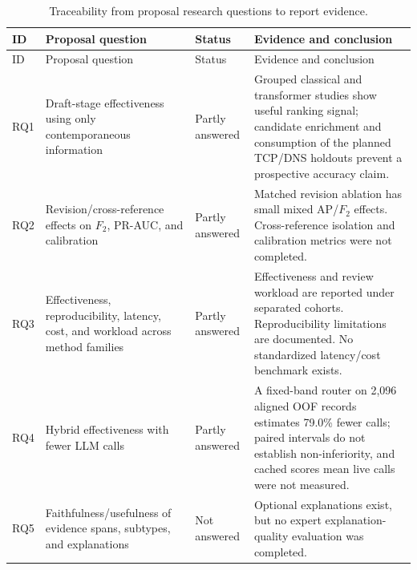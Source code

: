 \documentclass[12pt,a4paper,oneside]{report}
\begin{document}
{\small
\setlength{\tabcolsep}{4pt}
\begin{longtable}{>{\raggedright\arraybackslash}p{}>{\raggedright\arraybackslash}p{}>{\raggedright\arraybackslash}p{}>{\raggedright\arraybackslash}p{}}
\caption{Traceability from proposal research questions to report evidence.}\label{tab:rq-traceability}\\
\toprule
ID & Proposal question & Status & Evidence and conclusion \\
\midrule
\endfirsthead
\toprule
ID & Proposal question & Status & Evidence and conclusion \\
\midrule
\endhead
\bottomrule
\endfoot
RQ1 & Draft-stage effectiveness using only contemporaneous information & Partly answered & Grouped classical and transformer studies show useful ranking signal; candidate enrichment and consumption of the planned TCP/DNS holdouts prevent a prospective accuracy claim. \\
RQ2 & Revision/cross-reference effects on $F_2$, PR-AUC, and calibration & Partly answered & Matched revision ablation has small mixed AP/$F_2$ effects. Cross-reference isolation and calibration metrics were not completed. \\
RQ3 & Effectiveness, reproducibility, latency, cost, and workload across method families & Partly answered & Effectiveness and review workload are reported under separated cohorts. Reproducibility limitations are documented. No standardized latency/cost benchmark exists. \\
RQ4 & Hybrid effectiveness with fewer LLM calls & Partly answered & A fixed-band router on 2,096 aligned OOF records estimates 79.0\% fewer calls; paired intervals do not establish non-inferiority, and cached scores mean live calls were not measured. \\
RQ5 & Faithfulness/usefulness of evidence spans, subtypes, and explanations & Not answered & Optional explanations exist, but no expert explanation-quality evaluation was completed. \\
\end{longtable}
}
\end{document}
